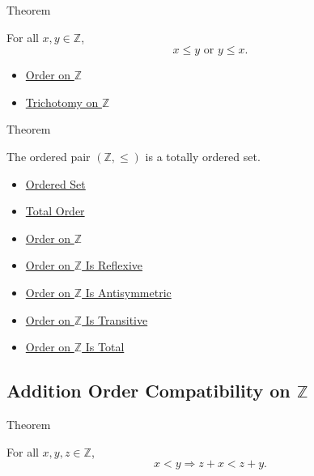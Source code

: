 \begin{theorembox}{Theorem}
\begin{theorem}
\label{thm:order-on-z-total}
For all $x,y\in\mathbb{Z}$,
\[
x\le y\text{ or }y\le x.
\]
\end{theorem}
\end{theorembox}

\begin{dependencies}
\begin{itemize}
  \item \hyperref[def:order-on-z]{Order on $\mathbb{Z}$}
  \item \hyperref[thm:trichotomy-on-z]{Trichotomy on $\mathbb{Z}$}
\end{itemize}
\end{dependencies}

\begin{theorembox}{Theorem}
\begin{theorem}
\label{thm:z-totally-ordered-set}
The ordered pair $(\mathbb{Z},\le)$ is a totally ordered set.
\end{theorem}
\end{theorembox}

\begin{dependencies}
\begin{itemize}
  \item \hyperref[def:ordered-set]{Ordered Set}
  \item \hyperref[def:total-order]{Total Order}
  \item \hyperref[def:order-on-z]{Order on $\mathbb{Z}$}
  \item \hyperref[thm:order-on-z-reflexive]{Order on $\mathbb{Z}$ Is Reflexive}
  \item \hyperref[thm:order-on-z-antisymmetric]{Order on $\mathbb{Z}$ Is Antisymmetric}
  \item \hyperref[thm:order-on-z-transitive]{Order on $\mathbb{Z}$ Is Transitive}
  \item \hyperref[thm:order-on-z-total]{Order on $\mathbb{Z}$ Is Total}
\end{itemize}
\end{dependencies}

\subsection*{Addition Order Compatibility on $\mathbb{Z}$}

\begin{theorembox}{Theorem}
\begin{theorem}
\label{thm:left-addition-preserves-strict-order-on-z}
For all $x,y,z\in\mathbb{Z}$,
\[
x<y \Longrightarrow z+x<z+y.
\]
\end{theorem}
\end{theorembox}

